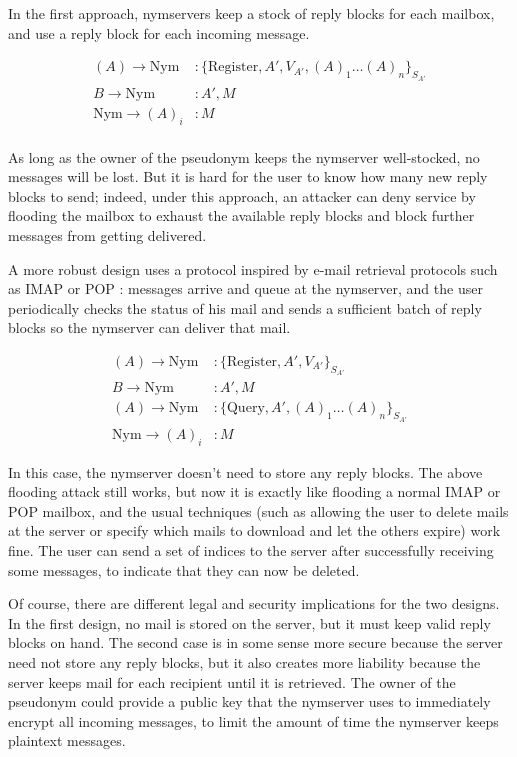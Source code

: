 \documentclass[11pt]{IEEEtran}
\begin{document}
In the first approach, nymservers keep a stock of reply blocks for
each mailbox, and use a reply block for each incoming message. 

\begin{equation}
\begin{aligned}
(A) \rightarrow \mathrm{Nym}&: \{\mathrm{Register} ,A', V_{A'}, (A)_1 \dots
(A)_n\}_{S_{A'}} \\ 
B \rightarrow \mathrm{Nym}&: A', M \\ 
\mathrm{Nym} \rightarrow (A)_i&: M \\
\end{aligned}
\end{equation}

As long
as the owner of the pseudonym keeps the nymserver well-stocked, no
messages will be lost.  But it is hard for the user to know how many
new reply blocks to send; indeed, under this approach, an attacker can
deny service by flooding the mailbox to exhaust the available
reply blocks and block further messages from getting delivered.

A more robust design uses a protocol inspired by e-mail retrieval
protocols such as IMAP \cite{IMAP} or POP \cite{POP3}:
messages arrive and queue at the nymserver, and the user periodically
checks the status of his mail and sends a sufficient batch of reply
blocks so the nymserver can deliver that mail.

\begin{equation}
\begin{aligned}
(A) \rightarrow \mathrm{Nym}&: \{\mathrm{Register} ,A', V_{A'}\}_{S_{A'}}\\
B \rightarrow \mathrm{Nym}&: A', M \\
(A) \rightarrow \mathrm{Nym}&: \{\mathrm{Query} ,A', (A)_1 \dots
(A)_n\}_{S_{A'}} \\
\mathrm{Nym} \rightarrow (A)_i&: M
\end{aligned}
\end{equation}

In this case, the nymserver doesn't need to store any reply blocks.
The above flooding attack still works, but now it is exactly
like flooding a normal IMAP or POP mailbox, and the usual techniques (such as
allowing the user to delete mails at the server or specify which mails to
download and let the others expire) work fine. The user can send a set
of indices to the server after successfully receiving
some messages, to indicate that they can now be deleted.

Of course, there are different legal and security implications for the two
designs. In the first design, no mail is stored on the server, but it must
keep valid reply blocks on hand. The second case is in some sense more
secure because the server need not store any reply blocks, but it also
creates more liability because the server keeps mail for each recipient
until it is retrieved. The owner of the pseudonym could provide a public
key that the nymserver uses to immediately encrypt all incoming messages,
to limit the amount of time the nymserver keeps plaintext messages.
\end{document}

